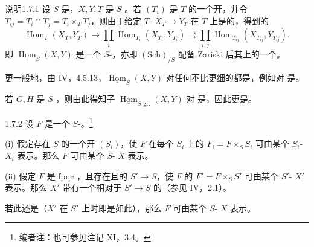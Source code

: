 \begin{SGAresult}{说明}{1.7.1}
设 $S$ 是，$X,Y,T$ 是 $S$-。若 $(T_i)$ 是 $T$ 的一个开，并令 $T_{ij}=T_i\cap T_j=T_i\times_TT_j$，则由于给定 $T$- $X_T\to Y_T$ 在 $T$ 上是的，得到的
\[
\operatorname{Hom}_T(X_T,Y_T)\longrightarrow
\prod_i\operatorname{Hom}_{T_i}(X_{T_i},Y_{T_i})
\rightrightarrows\prod_{i,j}\operatorname{Hom}_{T_{ij}}(X_{T_{ij}},Y_{T_{ij}}).\tag{1}
\]
即 $\underline{\operatorname{Hom}}_S(X,Y)$ 是一个 $S$-，亦即 $(\mathrm{Sch})_{/S}$ 配备 Zariski 后其上的一个。

更一般地，由 IV，4.5.13，$\underline{\operatorname{Hom}}_S(X,Y)$ 对任何不比更细的都是，例如对 是。

若 $G,H$ 是 $S$-，则由此得知子 $\underline{\operatorname{Hom}}_{S\text{-}\mathrm{gr.}}(X,Y)$ 对 是，因此更是。
\end{SGAresult}
\begin{SGAresult}{}{1.7.2}
设 $F$ 是一个 $S$-。\footnote[9]{编者注：也可参见注记 XI，3.4。}

(i) 假定存在 $S$ 的一个开 $(S_i)$，使 $F$ 在每个 $S_i$ 上的 $F_i=F\times_SS_i$ 可由某个 $S_i$- $X_i$ 表示。那么 $F$ 可由某个 $S$- $X$ 表示。

(ii) 假定 $F$ 是 fpqc ，且存在且的 $S'\to S$，使 $F$ 的 $F'=F\times_SS'$ 可由某个 $S'$- $X'$ 表示。那么 $X'$ 带有一个相对于 $S'\to S$ 的（参见 IV，2.1）。

若此还是（$X'$ 在 $S'$ 上时即是如此），那么 $F$ 可由某个 $S$- $X$ 表示。
\end{SGAresult}
